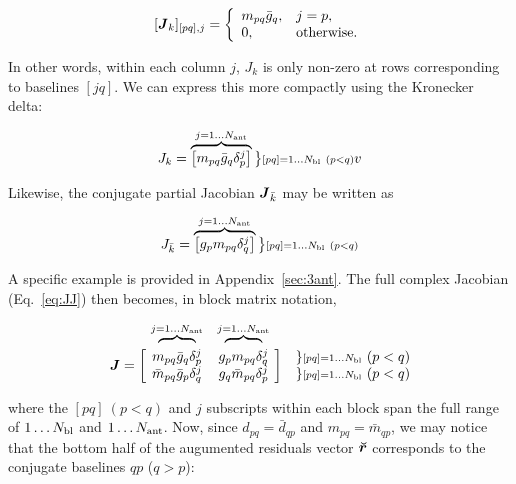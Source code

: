 \documentclass[useAMS,usenatbib]{mn2e}
\newcommand{\mat}[1]{{\bmath{#1}}}
\newcommand{\JJ}{\mat{J}} %
\begin{document}
\[
[ \JJ_k ]_{[pq],j} = \left \{  
  \begin{array}{ll} 
  m_{pq}\bar{g}_q,& j=p, \\
  0, & \mathrm{otherwise.}
  \end{array}
\right .
\]

In other words, within each column $j$, $J_k$ is only non-zero at rows corresponding to baselines $[jq]$. We can express 
this more compactly using the Kronecker delta:


\begin{equation}
\label{eq:Jk}
J_k = \overbrace{ \Matrix{c}{ m_{pq}\bar{g}_q\delta^{j}_p } } ^{j=1\dots \Na} \big \}{\scriptstyle [pq]=1\dots \Nbl~(p<q)}
v\end{equation}

Likewise, the conjugate partial Jacobian $\JJ_{\bar{k}}$ may be written as

\begin{equation}
\label{eq:Jbark}
J_{\bar{k}} = \overbrace{ \Matrix{c}{ g_p m_{pq} \delta^{j}_q } } ^{j=1\dots \Na} \big \}{\scriptstyle [pq]=1\dots \Nbl~(p<q)}
\end{equation}

A specific example is provided in Appendix~\ref{sec:3ant}. The full complex Jacobian (Eq.~\ref{eq:JJ}) then 
becomes, in block matrix notation,

\begin{equation}
\label{eq:JJ:di:basic}
\begin{array}{r@{~}cc@{~}cc}
                & \overbrace{~~~~~~~~}^{j=1\dots \Na} & \overbrace{~~~~~~~~}^{j=1\dots \Na} \\
\JJ = \bigg [ &
  \Stack{ m_{pq}\bar{g}_q\delta^{j}_p \\ \bar{m}_{pq} \bar{g}_p \delta^{j}_q } &
  \Stack{ g_p m_{pq} \delta^{j}_q \\ g_q \bar{m}_{pq} \delta^{j}_p }  
& \bigg ] &
\Stack{ \} {\scriptstyle [pq]=1\dots \Nbl}~(p<q) \\ \} {\scriptstyle [pq]=1\dots \Nbl}~(p<q) }

\end{array}
\end{equation}

where the $[pq]~(p<q)$ and $j$ subscripts within each block span the full range of $1\dots N_\mathrm{bl}$ and $1\dots N_\mathrm{ant}$. Now, 
since $d_{pq} = \bar{d}_{qp}$ and $m_{pq} = \bar{m}_{qp}$, we may notice
that the bottom half of the augumented residuals vector $\Rr$ corresponds to the conjugate baselines 
$qp$ ($q>p$):
\end{document}
